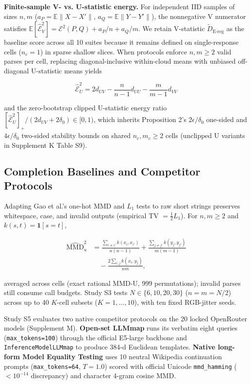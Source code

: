 \documentclass[10pt,journal,compsoc]{IEEEtran}
\newcommand{\Dereg}{\tilde D_{\mathrm{E\mbox{-}reg}}}
\begin{document}
\textbf{Finite-sample V- vs. U-statistic energy.} For independent IID samples of sizes $n,m$ ($a_P=\mathbb E\|X-X'\|$, $a_Q=\mathbb E\|Y-Y'\|$), the nonnegative V numerator satisfies $\mathbb E[\widehat{\mathcal E}_V^2]=\mathcal E^2(P,Q)+a_P/n+a_Q/m$. We retain V-statistic $\Dereg{}$ as the baseline score across all 10 suites because it remains defined on single-response cells ($n_c=1$) in sparse shallow slices. When protocols enforce $n,m\ge2$ valid parses per cell, replacing diagonal-inclusive within-cloud means with unbiased off-diagonal U-statistic means yields


\begin{equation*}
\widehat{\mathcal E}_U^2=2d_{UV}-\frac{n}{n-1}d_{UU}-\frac{m}{m-1}d_{VV}
\end{equation*}

\noindent and the zero-bootstrap clipped U-statistic energy ratio $[\widehat{\mathcal E}_U^2]_+/(2d_{UV}+2\delta_0)\in[0,1)$, which inherits Proposition 2's $2\epsilon/\delta_0$ one-sided and $4\epsilon/\delta_0$ two-sided stability bounds on shared $n_c,m_c\ge 2$ cells (unclipped U variants in Supplement K Table S9).


\subsection{Completion Baselines and Competitor Protocols}

Adapting Gao et al.'s one-hot MMD and $L_1$ tests \cite{ref4} to raw short strings preserves whitespace, case, and invalid outputs (empirical TV $= \tfrac12 L_1$). For $n,m\ge2$ and $k(s,t)=\mathbf1[s=t]$,


\begin{equation*}
\begin{aligned}\widehat{\mathrm{MMD}}_u^2&=\frac{\sum_{i\ne i'}k(x_i,x_{i'})}{n(n-1)}+\frac{\sum_{j\ne j'}k(y_j,y_{j'})}{m(m-1)}\\
&\quad-\frac{2\sum_{i,j}k(x_i,y_j)}{nm},\end{aligned}
\end{equation*}

\noindent averaged across cells (exact rational MMD-U, 999 permutations); invalid parses still consume call budgets. Study S3 tests $N\in\{6,10,20,30\}$ ($n=m=N/2$) across up to 40 $K$-cell subsets ($K=1,\ldots,10$), with ten fixed RGB-jitter seeds.


Study S5 evaluates two native competitor protocols on the 20 locked OpenRouter models (Supplement M). \textbf{Open-set LLMmap} \cite{ref16} runs its verbatim eight queries (\texttt{max\_\allowbreak{}tokens=\allowbreak{}100}) through the official E5-large backbone and \texttt{InferenceModelLLMmap} to produce 384-d Euclidean templates. \textbf{Native long-form Model Equality Testing} \cite{ref4} uses 10 neutral Wikipedia continuation prompts (\texttt{max\_\allowbreak{}tokens=\allowbreak{}64}, $T=1.0$) scored with official Unicode \texttt{mmd\_\allowbreak{}hamming} ($<10^{-14}$ discrepancy) and character 4-gram cosine MMD.
\end{document}
